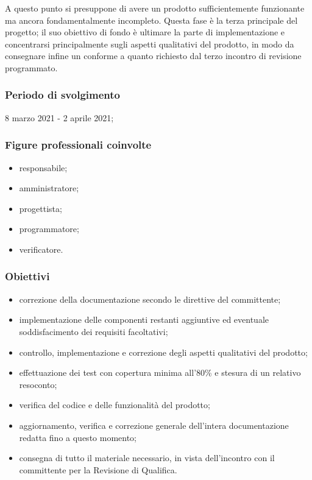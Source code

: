 A questo punto si presuppone di avere un prodotto sufficientemente funzionante ma ancora fondamentalmente incompleto. Questa fase è la terza  principale del progetto; il suo obiettivo di fondo è ultimare la parte di implementazione e concentrarsi principalmente sugli aspetti qualitativi del prodotto, in modo da consegnare infine un  conforme a quanto richiesto dal terzo incontro di revisione programmato.
        
        \subsubsection{Periodo di svolgimento}
        8 marzo 2021 - 2 aprile 2021;
        
        \subsubsection{Figure professionali coinvolte}
            \begin{itemize}
                \item responsabile;
                \item amministratore;
                \item progettista;
                \item programmatore;
                \item verificatore.
            \end{itemize}

        \subsubsection{Obiettivi}
        \begin{itemize}
            \item correzione della documentazione secondo le direttive del committente;
            \item implementazione delle componenti restanti aggiuntive ed eventuale soddisfacimento dei requisiti facoltativi;
            \item controllo, implementazione e correzione degli aspetti qualitativi del prodotto;
            \item effettuazione dei test con copertura minima all'80\% e stesura di un relativo resoconto;
            \item verifica del codice e delle funzionalità del prodotto;
            \item aggiornamento, verifica e correzione generale dell'intera documentazione redatta fino a questo momento;
            \item consegna di tutto il materiale necessario, in vista dell'incontro con il committente per la Revisione di Qualifica.
        \end{itemize}